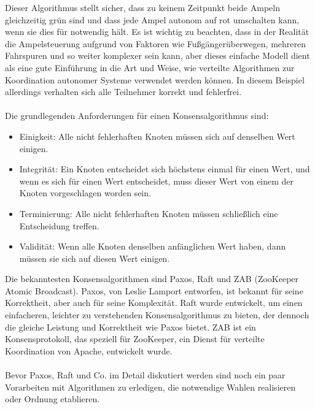 Dieser Algorithmus stellt sicher, dass zu keinem Zeitpunkt beide Ampeln gleichzeitig grün sind und dass jede Ampel autonom auf rot umschalten kann, wenn sie dies für notwendig hält. Es ist wichtig zu beachten, dass in der Realität die Ampelsteuerung aufgrund von Faktoren wie Fußgängerüberwegen, mehreren Fahrspuren und so weiter komplexer sein kann, aber dieses einfache Modell dient als eine gute Einführung in die Art und Weise, wie verteilte Algorithmen zur Koordination autonomer Systeme verwendet werden können.
In diesem Beispiel allerdings verhalten sich alle Teilnehmer korrekt und fehlerfrei.
\\\\
Die grundlegenden Anforderungen für einen Konsensalgorithmus sind:
\begin{itemize}
\item Einigkeit: Alle nicht fehlerhaften Knoten müssen sich auf denselben Wert einigen.
\item Integrität: Ein Knoten entscheidet sich höchstens einmal für einen Wert, und wenn es sich für einen Wert entscheidet, muss dieser Wert von einem der Knoten vorgeschlagen worden sein.
\item Terminierung: Alle nicht fehlerhaften Knoten müssen schließlich eine Entscheidung treffen.
\item Validität: Wenn alle Knoten denselben anfänglichen Wert haben, dann müssen sie sich auf diesen Wert einigen.
\end{itemize}
Die bekanntesten Konsensalgorithmen sind Paxos, Raft und ZAB (ZooKeeper Atomic Broadcast). Paxos, von Leslie Lamport entworfen, ist bekannt für seine Korrektheit, aber auch für seine Komplexität. Raft wurde entwickelt, um einen einfacheren, leichter zu verstehenden Konsensalgorithmus zu bieten, der dennoch die gleiche Leistung und Korrektheit wie Paxos bietet. ZAB ist ein Konsensprotokoll, das speziell für ZooKeeper, ein Dienst für verteilte Koordination von Apache, entwickelt wurde.
\\\\
Bevor Paxos, Raft und Co. im Detail diskutiert werden sind noch ein paar Vorarbeiten mit Algorithmen zu erledigen, die notwendige Wahlen realisieren oder Ordnung etablieren.

